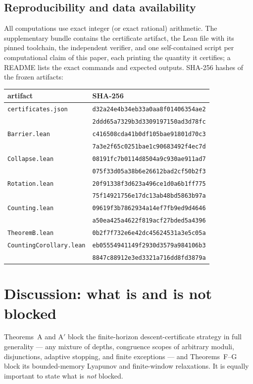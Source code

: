 \documentclass[11pt]{article}
\theoremstyle{definition}
\begin{document}
\subsection{Reproducibility and data availability}
All computations use exact integer (or exact rational) arithmetic. The
supplementary bundle contains the certificate artifact, the Lean file with
its pinned toolchain, the independent verifier, and one self-contained
script per computational claim of this paper, each printing the quantity it
certifies; a README lists the exact commands and expected outputs. SHA-256
hashes of the frozen artifacts:
\begin{center}
\small
\begin{tabular}{ll}
\toprule
artifact & SHA-256\\
\midrule
\texttt{certificates.json} & \texttt{d32a24e4b34eb33a0aa8f01406354ae2}\\
 & \texttt{2ddd65a7329b3d3309197150ad3d78fc}\\
\texttt{Barrier.lean} & \texttt{c416508cda41b0df105bae91801d70c3}\\
 & \texttt{7a3e2f65c0251bae1c90683492f4ec7d}\\
\texttt{Collapse.lean} & \texttt{08191fc7b0114d8504a9c930ae911ad7}\\
 & \texttt{075f33d05a38b6e26612bad2cf50b2f3}\\
\texttt{Rotation.lean} & \texttt{20f91338f3d623a496ce1d0a6b1ff775}\\
 & \texttt{75f14921756e17dc13ab48bd5863b97a}\\
\texttt{Counting.lean} & \texttt{09619f3b7862934a14ef7fb9ed9d4646}\\
 & \texttt{a50ea425a4622f819acf27bded5a4396}\\
\texttt{TheoremB.lean} & \texttt{0b2f7f732e6e42dc45624531a3e5c05a}\\
\texttt{CountingCorollary.lean} & \texttt{eb05554941149f2930d3579a984106b3}\\
 & \texttt{8847c88912e3ed3321a716dd8fd3879a}\\
\bottomrule
\end{tabular}
\end{center}

\section{Discussion: what is and is not blocked}\label{sec:discussion}

Theorems~A and A$'$ block the finite-horizon descent-certificate strategy
in full generality --- any mixture of depths, congruence scopes of arbitrary
moduli, disjunctions, adaptive stopping, and finite exceptions --- and
Theorems~F--G block its bounded-memory Lyapunov and finite-window
relaxations. It is equally important to state what is \emph{not} blocked.
\end{document}

